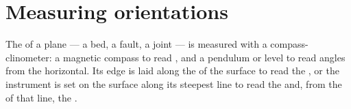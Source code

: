 \section{Measuring orientations}

The  of a plane --- a bed, a fault, a joint --- is measured with a
compass-clinometer: a magnetic compass to read , and a pendulum or
level to read angles from the horizontal. Its edge is laid along the 
of the surface to read the , or the instrument is set on the surface
along its steepest line to read the  and, from the  of that line,
the .

